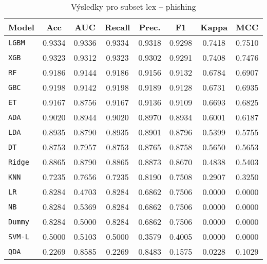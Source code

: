 \begin{table}[H]
  \centering
  \small
  \caption{Výsledky pro subset lex – phishing}
  \begin{tabular}{|l|c|c|c|c|c|c|c|}
    \hline
    \textbf{Model} & \textbf{Acc} & \textbf{AUC} & \textbf{Recall} & \textbf{Prec.} & \textbf{F1} & \textbf{Kappa} & \textbf{MCC} \\
    \hline
    \texttt{LGBM} & 0.9334 & 0.9336 & 0.9334 & 0.9318 & 0.9298 & 0.7418 & 0.7510 \\
    \texttt{XGB} & 0.9323 & 0.9312 & 0.9323 & 0.9302 & 0.9291 & 0.7408 & 0.7476 \\
    \texttt{RF} & 0.9186 & 0.9144 & 0.9186 & 0.9156 & 0.9132 & 0.6784 & 0.6907 \\
    \texttt{GBC} & 0.9198 & 0.9142 & 0.9198 & 0.9189 & 0.9128 & 0.6731 & 0.6935 \\
    \texttt{ET} & 0.9167 & 0.8756 & 0.9167 & 0.9136 & 0.9109 & 0.6693 & 0.6825 \\
    \texttt{ADA} & 0.9020 & 0.8944 & 0.9020 & 0.8970 & 0.8934 & 0.6001 & 0.6187 \\
    \texttt{LDA} & 0.8935 & 0.8790 & 0.8935 & 0.8901 & 0.8796 & 0.5399 & 0.5755 \\
    \texttt{DT} & 0.8753 & 0.7957 & 0.8753 & 0.8765 & 0.8758 & 0.5650 & 0.5653 \\
    \texttt{Ridge} & 0.8865 & 0.8790 & 0.8865 & 0.8873 & 0.8670 & 0.4838 & 0.5403 \\
    \texttt{KNN} & 0.7235 & 0.7656 & 0.7235 & 0.8190 & 0.7508 & 0.2907 & 0.3250 \\
    \texttt{LR} & 0.8284 & 0.4703 & 0.8284 & 0.6862 & 0.7506 & 0.0000 & 0.0000 \\
    \texttt{NB} & 0.8284 & 0.5369 & 0.8284 & 0.6862 & 0.7506 & 0.0000 & 0.0000 \\
    \texttt{Dummy} & 0.8284 & 0.5000 & 0.8284 & 0.6862 & 0.7506 & 0.0000 & 0.0000 \\
    \texttt{SVM-L} & 0.5000 & 0.5103 & 0.5000 & 0.3579 & 0.4005 & 0.0000 & 0.0000 \\
    \texttt{QDA} & 0.2269 & 0.8585 & 0.2269 & 0.8483 & 0.1575 & 0.0228 & 0.1029 \\
    \hline
  \end{tabular}
\end{table}
\vspace{0.5cm}

